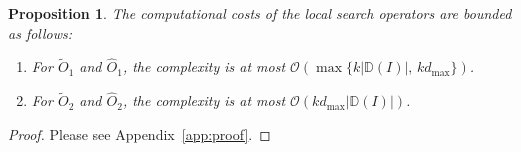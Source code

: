 \documentclass[12pt, a4paper]{article}%
\numberwithin{equation}{section}
\theoremstyle{plain}
\newtheorem{prop}{Proposition}
\begin{document}
			
			\begin{prop}\label{thm::o1comp}
				The computational costs of the local search operators are bounded as follows:
				\begin{enumerate}
					\item For $\widetilde{O}_1$ and $\widehat{O}_1$, the complexity is at most $\mathcal{O}(\max\{k |\mathbb{D}(I)|,\,k d_{\max}\})$.
					\item For $\widetilde{O}_2$ and $\widehat{O}_2$, the complexity is at most $\mathcal{O}(k d_{\max}|\mathbb{D}(I)|)$.
				\end{enumerate}
			\end{prop}
			\begin{proof}
				Please see Appendix~\ref{app:proof}. 
			\end{proof}
			
			
			
\end{document}
